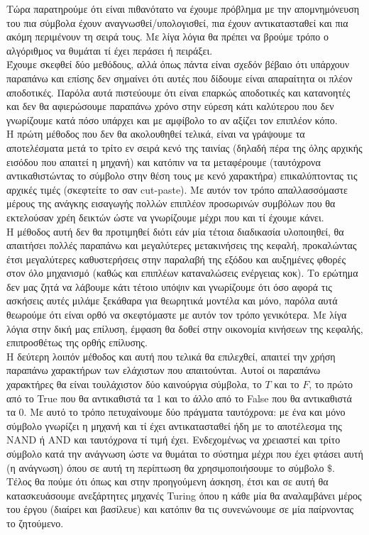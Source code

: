 \par
Τώρα παρατηρούμε ότι είναι πιθανότατο να έχουμε πρόβλημα με την απομνημόνευση του πια σύμβολα έχουν
αναγνωσθεί/υπολογισθεί, πια έχουν αντικατασταθεί και πια ακόμη περιμένουν τη σειρά τους. Με λίγα λόγια θα πρέπει να
βρούμε τρόπο ο αλγόριθμος να θυμάται τί έχει περάσει ή πειράξει.\\
Έχουμε σκεφθεί δύο μεθόδους, αλλά όπως πάντα είναι σχεδόν βέβαιο ότι υπάρχουν παραπάνω και επίσης δεν σημαίνει ότι
αυτές που δίδουμε είναι απαραίτητα οι πλέον αποδοτικές. Παρόλα αυτά πιστεύουμε ότι είναι επαρκώς αποδοτικές και
κατανοητές και δεν θα αφιερώσουμε παραπάνω χρόνο στην εύρεση κάτι καλύτερου που δεν γνωρίζουμε κατά πόσο υπάρχει
και με αμφίβολο το αν αξίζει τον επιπλέον κόπο.\\
Η πρώτη μέθοδος που δεν θα ακολουθηθεί τελικά, είναι να γράψουμε τα αποτελέσματα μετά το τρίτο εν σειρά κενό της
ταινίας (δηλαδή πέρα της όλης αρχικής εισόδου που απαιτεί η μηχανή) και κατόπιν να τα μεταφέρουμε (ταυτόχρονα
αντικαθιστώντας το σύμβολο στην θέση τους με κενό χαρακτήρα) επικαλύπτοντας τις αρχικές τιμές (σκεφτείτε το σαν
cut-paste). Με αυτόν τον τρόπο απαλλασσόμαστε μέρους της ανάγκης εισαγωγής πολλών επιπλέον προσωρινών συμβόλων που
θα εκτελούσαν χρέη δεικτών ώστε να γνωρίζουμε μέχρι που και τί έχουμε κάνει.\\
Η μέθοδος αυτή δεν θα προτιμηθεί διότι εάν μία τέτοια διαδικασία υλοποιηθεί, θα απαιτήσει πολλές παραπάνω και
μεγαλύτερες μετακινήσεις της κεφαλή, προκαλώντας έτσι μεγαλύτερες καθυστερήσεις στην παραλαβή της εξόδου και
αυξημένες φθορές στον όλο μηχανισμό (καθώς και επιπλέων καταναλώσεις ενέργειας κοκ). Το ερώτημα δεν μας ζητά να
λάβουμε κάτι τέτοιο υπόψιν και γνωρίζουμε ότι όσο αφορά τις ασκήσεις αυτές μιλάμε ξεκάθαρα για θεωρητικά μοντέλα
και μόνο, παρόλα αυτά θεωρούμε ότι είναι ορθό να σκεφτόμαστε με αυτόν τον τρόπο γενικότερα. Με λίγα λόγια στην δική
μας επίλυση, έμφαση θα δοθεί στην οικονομία κινήσεων της κεφαλής, επιπροσθέτως της ορθής επίλυσης.\\
Η δεύτερη λοιπόν μέθοδος και αυτή που τελικά θα επιλεχθεί, απαιτεί την χρήση παραπάνω χαρακτήρων των ελάχιστων που
απαιτούνται. Αυτοί οι παραπάνω χαρακτήρες θα είναι τουλάχιστον δύο καινούργια σύμβολα, το $T$ και το $F$, το πρώτο
από το True που θα αντικαθιστά τα 1 και το άλλο από το False που θα αντικαθιστά τα 0. Με αυτό το τρόπο πετυχαίνουμε
δύο πράγματα ταυτόχρονα: με ένα και μόνο σύμβολο γνωρίζει η μηχανή και τί έχει αντικατασταθεί ήδη με το αποτέλεσμα
της NAND ή AND και ταυτόχρονα τί τιμή έχει. Ενδεχομένως να χρειαστεί και τρίτο σύμβολο κατά την ανάγνωση ώστε να
θυμάται το σύστημα μέχρι που έχει φτάσει αυτή (η ανάγνωση) όπου σε αυτή τη περίπτωση θα χρησιμοποιήσουμε το σύμβολο
$\$$.\\
Τέλος θα πούμε ότι όπως και στην προηγούμενη άσκηση, έτσι και σε αυτή θα κατασκευάσουμε ανεξάρτητες μηχανές Turing
όπου η κάθε μία θα αναλαμβάνει μέρος του έργου (διαίρει και βασίλευε) και κατόπιν θα τις συνενώνουμε σε μία
παίρνοντας το ζητούμενο.

